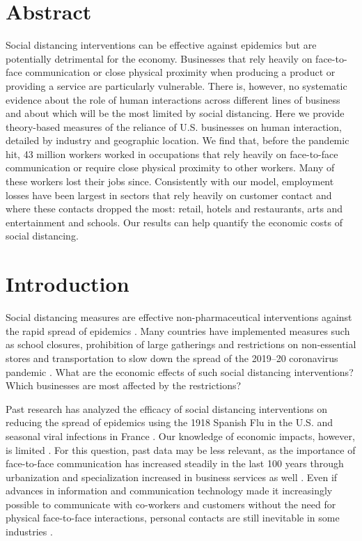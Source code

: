 \documentclass[10pt,letterpaper]{article}
\begin{document}
\section*{Abstract}
Social distancing interventions can be effective against epidemics but are potentially detrimental for the economy.
Businesses that rely heavily on face-to-face communication or close physical proximity when producing a product or providing a service are particularly vulnerable. 
There is, however, no systematic evidence about the role of human interactions across different lines of business and about which will be the most limited by social distancing.
Here we provide theory-based measures of the reliance of U.S. businesses on human interaction, detailed by industry and geographic location.
We find that, before the pandemic hit, 43 million workers worked in occupations that rely heavily on face-to-face communication or require close physical proximity to other workers. Many of these workers lost their jobs since. Consistently with our model, employment losses have been largest in sectors that rely heavily on customer contact and where these contacts dropped the most: retail, hotels and restaurants, arts and entertainment and schools. Our results can help quantify the economic costs of social distancing.

\linenumbers


\section*{Introduction}

Social distancing measures are effective non-pharmaceutical interventions against the rapid spread of epidemics \cite{Bootsma2007-ww,Markel2007-ad,Hatchett2007-gc,Wilder-Smith2020-jj}. Many countries have implemented measures such as school closures, prohibition of large gatherings and restrictions on non-essential stores and transportation to slow down the spread of the 2019--20 coronavirus pandemic \cite{Anderson2020-qk,Cohen2020-jw,Thompson2020-lc,noauthor_2020-xi}. What are the economic effects of such social distancing interventions? Which businesses are most affected by the restrictions?

Past research has analyzed the efficacy of social distancing interventions on reducing the spread of epidemics using the 1918 Spanish Flu in the U.S. \cite{Hatchett2007-gc,Markel2007-ad,Bootsma2007-ww} and seasonal viral infections in France \cite{Adda2016-mn}. Our knowledge of economic impacts, however, is limited \cite{Wren-Lewis2020-vc}. For this question, past data may be less relevant, as the importance of face-to-face communication has increased steadily in the last 100 years through urbanization \cite{Henderson2010-mv,Henderson2002-ji} and specialization increased in business services as well \cite{Herrendorf2014-jx,Duarte2019-kc}. 
Even if advances in information and communication technology made it increasingly possible to communicate with co-workers and customers without the need for physical face-to-face interactions, personal contacts are still inevitable in some industries \cite{Dingel2020-lh,von2020labour}.
\end{document}
